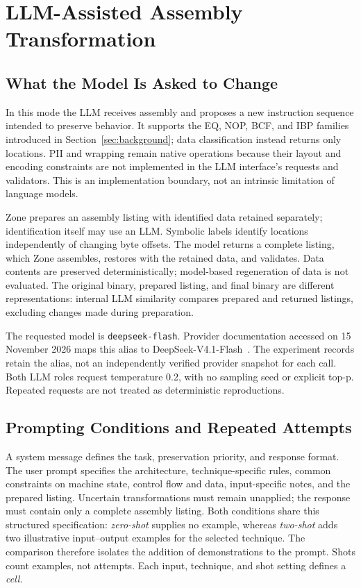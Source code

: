 \section{LLM-Assisted Assembly Transformation}\label{sec:llm}
\subsection{What the Model Is Asked to Change}
In this mode the LLM receives assembly and proposes a new instruction
sequence intended to preserve behavior. It supports the EQ, NOP, BCF,
and IBP families introduced in Section~\ref{sec:background}; data
classification instead returns only locations. PII and wrapping remain
native operations because their layout and encoding constraints are not
implemented in the LLM interface's requests and validators. This is an
implementation boundary, not an intrinsic limitation of language models.

Zone prepares an assembly listing with identified data retained separately;
identification itself may use an LLM. Symbolic labels identify locations
independently of changing byte offsets. The model returns a complete listing,
which Zone assembles, restores with the retained data, and validates.
Data contents are preserved deterministically; model-based regeneration
of data is not evaluated. The original binary, prepared listing, and final
binary are different representations: internal LLM similarity compares
prepared and returned listings, excluding changes made during preparation.

The requested model is \texttt{deepseek-flash}. Provider documentation
accessed on 15 November 2026 maps this alias to DeepSeek-V4.1-Flash~\cite{deepseek_models}.
The experiment records retain the alias, not an independently verified
provider snapshot for each call.
Both LLM roles request temperature 0.2, with no sampling seed or explicit
top-p. Repeated requests are not treated as deterministic reproductions.

\subsection{Prompting Conditions and Repeated Attempts}
A system message defines the task, preservation priority, and response
format. The user prompt specifies the architecture, technique-specific
rules, common constraints on machine state, control flow and data,
input-specific notes, and the prepared listing. Uncertain transformations
must remain unapplied; the response must contain only a complete assembly
listing. Both conditions share this structured specification:
\emph{zero-shot} supplies no example, whereas \emph{two-shot} adds two
illustrative input--output examples for the selected technique. The comparison
therefore isolates the addition of demonstrations to the prompt. Shots count
examples, not attempts. Each input, technique, and shot setting defines a
\emph{cell}.

